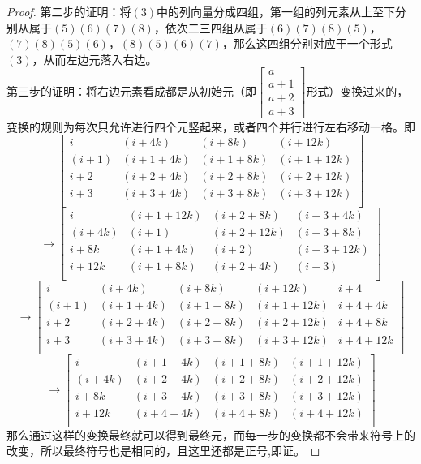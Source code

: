\documentclass[twoside,a4paper,CCT]{cctart}   %
\begin{document}
\begin{proof}
第二步的证明：将$(3)$中的列向量分成四组，第一组的列元素从上至下分别从属于$(5)(6)(7)(8)$，依次二三四组从属于$(6)(7)(8)(5)$，$(7)(8)(5)(6)$，$(8)(5)(6)(7)$，那么这四组分别对应于一个形式$(3)$，从而左边元落入右边。\\
第三步的证明：将右边元素看成都是从初始元（即$\begin{bmatrix}a\\a+1\\a+2\\a+3 \end{bmatrix}$形式）变换过来的，变换的规则为每次只允许进行四个元竖起来，或者四个并行进行左右移动一格。即
$$\begin{bmatrix}i&(i+4k)&(i+8k)&(i+12k)\\
(i+1)&(i+1+4k)&(i+1+8k)&(i+1+12k)\\
i+2&(i+2+4k)&(i+2+8k)&(i+2+12k)\\
i+3&(i+3+4k)&(i+3+8k)&(i+3+12k)\\\end{bmatrix}$$
$$\rightarrow\begin{bmatrix}i&(i+1+12k)&(i+2+8k)&(i+3+4k)\\
(i+4k)&(i+1)&(i+2+12k)&(i+3+8k)\\
i+8k&(i+1+4k)&(i+2)&(i+3+12k)\\
i+12k&(i+1+8k)&(i+2+4k)&(i+3)\\\end{bmatrix}$$
$$\rightarrow\begin{bmatrix}i&(i+4k)&(i+8k)&(i+12k)&i+4\\
(i+1)&(i+1+4k)&(i+1+8k)&(i+1+12k)&i+4+4k\\
i+2&(i+2+4k)&(i+2+8k)&(i+2+12k)&i+4+8k\\
i+3&(i+3+4k)&(i+3+8k)&(i+3+12k)&i+4+12k\\\end{bmatrix}$$
$$\rightarrow\begin{bmatrix}i&(i+1+4k)&(i+1+8k)&(i+1+12k)\\
(i+4k)&(i+2+4k)&(i+2+8k)&(i+2+12k)\\
i+8k&(i+3+4k)&(i+3+8k)&(i+3+12k)\\
i+12k&(i+4+4k)&(i+4+8k)&(i+4+12k)\\\end{bmatrix}$$ 那么通过这样的变换最终就可以得到最终元，而每一步的变换都不会带来符号上的改变，所以最终符号也是相同的，且这里还都是正号,即证。
\end{proof}
\end{document}

